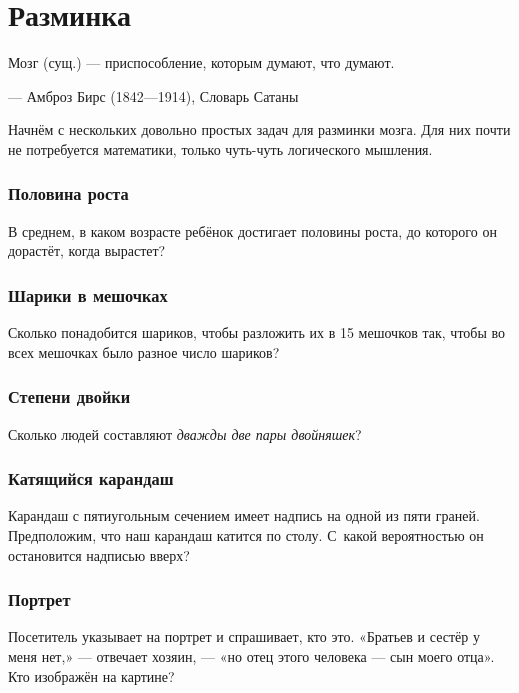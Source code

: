 \chapter{Разминка}

\setlength{\epigraphwidth}{.80\textwidth}
\epigraph{Мозг (сущ.) --- приспособление, которым думают, что думают.}{--- Амброз Бирс (1842---1914), Словарь Сатаны}

Начнём с нескольких довольно простых задач для разминки мозга.
Для них почти не потребуется математики, только чуть-чуть логического мышления.

\subsection*{Половина роста}


В среднем, в каком возрасте ребёнок достигает половины роста, до которого он дорастёт, когда вырастет?

\subsection*{Шарики в мешочках}

Сколько понадобится шариков, чтобы разложить их в 15 мешочков так,
чтобы во всех мешочках было разное число шариков?

\subsection*{Степени двойки}

Сколько людей составляют \emph{дважды две пары двойняшек}?

\subsection*{Катящийся карандаш}

Карандаш с пятиугольным сечением имеет надпись на одной из пяти граней.
Предположим, что наш карандаш катится по столу.
С~какой вероятностью он остановится надписью вверх?

\subsection*{Портрет}

Посетитель указывает на портрет и спрашивает, кто это. 
«Братьев и сестёр у меня нет,» --- отвечает хозяин, --- «но отец этого человека --- сын моего отца».
Кто изображён на картине?

